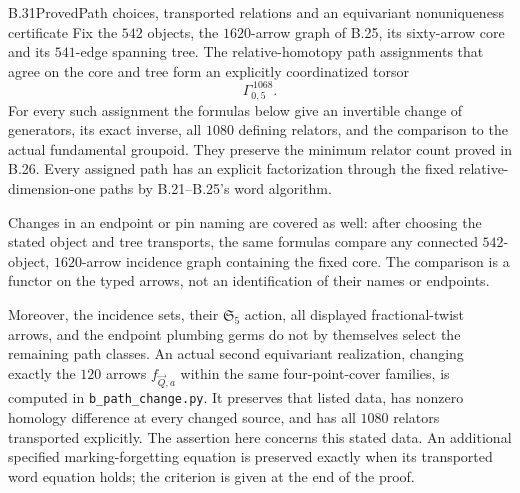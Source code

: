 \begin{result}{B.31}{Proved}{Path choices, transported relations and an equivariant nonuniqueness certificate}
Fix the $542$ objects, the $1620$-arrow graph of B.25, its
sixty-arrow core and its $541$-edge spanning tree.  The
relative-homotopy path assignments that agree on the core
and tree form an explicitly coordinatized torsor
\[
                  \Gamma_{0,5}^{\,1068}.                       \tag{B.109}
\]
For every such assignment the formulas below give an
invertible change of generators, its exact inverse, all
$1080$ defining relators, and the comparison to the actual
fundamental groupoid.  They preserve the minimum relator
count proved in B.26.  Every assigned path has an explicit
factorization through the fixed relative-dimension-one
paths by B.21--B.25's word algorithm.

Changes in an endpoint or pin naming are covered as well:
after choosing the stated object and tree transports, the
same formulas compare any connected $542$-object,
$1620$-arrow incidence graph containing the fixed core.
The comparison is a functor on the typed arrows, not an
identification of their names or endpoints.

Moreover, the incidence sets, their $\mathfrak S_5$ action,
all displayed fractional-twist arrows, and the endpoint
plumbing germs do not by themselves select the remaining
path classes.  An actual second equivariant realization,
changing exactly the $120$ arrows $f_{\vec Q,a}$ within the
same four-point-cover families, is computed in
\texttt{b\_path\_change.py}.  It preserves that listed data,
has nonzero homology difference at every changed source,
and has all $1080$ relators transported explicitly.
The assertion here concerns this stated data.  An additional
specified marking-forgetting equation is preserved exactly
when its transported word equation holds; the criterion is
given at the end of the proof.
\end{result}
